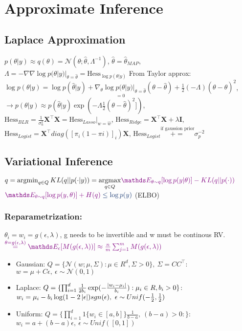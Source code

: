 \section{Approximate Inference}

\subsection{Laplace Approximation}
$p(\theta|y) \approx q(\theta) = \mathcal{N}(\theta; \hat{\theta}, \Lambda^{-1})$, 
$\hat{\theta}=\hat{\theta}_{MAP}$, 
$\Lambda = -\nabla\nabla \log p(\theta|y)|_{\theta=\hat{\theta}} = \text{Hess}_{\log p(\theta|y)}$
From Taylor approx: $\log p(\theta|y) = \log p(\hat{\theta}|y) +
\underset{=0}{\nabla_{\theta} \log p(\theta|y)|_{\theta=\hat{\theta}}}(\theta - \hat{\theta}) +
\frac{1}{2} (-\Lambda) (\theta - \hat{\theta})^{2}$, 
$\rightarrow p(\theta|y) \approx p(\hat{\theta}|y) \exp(- \Lambda \frac{1}{2} (\theta - \hat{\theta})^{2}])$,
$\text{Hess}_{BLR} = \frac{1}{\sigma_{n}^{2}}\bm{X}^{\top}\bm{X} = \text{Hess}_{Lasso}|_{w=\hat{w}}$,
$\text{Hess}_{Ridge} = \bm{X}^{\top}\bm{X} + \lambda\bm{I}$,
$\text{Hess}_{Logist} = \bm{X}^{\top}diag([\pi_{i}(1-\pi{i})]_{i})\bm{X}$,
$\text{Hess}_{Logist} \overset{\text{if gaussion prior}}{+=} \sigma_{p}^{-2}$

\subsection{Variational Inference}
$q=\argmin_{q \in Q}KL(q||p(\cdot|y))=\underset{q\in Q}\argmax \color{violet}\E[\theta \sim q]{\log p(y|\theta)} - KL(q||p(\cdot)) \\$
$\color{violet} \E[\theta \sim q]{\log p(y,\theta)} + H(q) \color{myblue} \leq \log p(y)$ \color{violet}(ELBO)
\color{black}
\subsubsection{Reparametrization:}
$\theta_{i}=w_{i}= g(\epsilon, \lambda)$, g needs to be invertible and w must be continous RV.\\
$\color{violet} \overset{\theta= g(\epsilon, \lambda)}{=} \E[\epsilon]{M(g(\epsilon, \lambda))} \approx \frac{n}{m} \sum_{j=1}^{m}M(g(\epsilon, \lambda))$

\begin{itemize}
    \item
    Gaussian: $Q=\{\mathcal{N}(w; \mu, \Sigma): \mu \in R^{d}, \Sigma > 0\},\ \Sigma=CC^{\top}$:
    $w=\mu +C \epsilon,\ \epsilon \sim \mathcal{N}(0,1)$
    \item
    Laplace: $Q=\{ \prod_{i=1}^{d} \frac{1}{2b_{i}} \exp(- \frac{\left\lvert w_{i}- \mu_{i}\right\rvert}{b_{i}}): \mu_{i} \in R, b_{i}>0\}$:
    $w_{i}= \mu_{i}-b_{i}\log(1-2\left\lvert\epsilon\right\rvert)sgn(\epsilon),\ \epsilon \sim Unif(-\frac{1}{2}, \frac{1}{2})$
    \item
    Uniform: $Q=\{\prod_{i=1}^{d} 1\{w_{i} \in \left[ a,b \right] \}\frac{1}{b-a},\ (b-a)>0:\}$:
    $w_{i}= a+(b-a)\epsilon,\ \epsilon \sim Unif(\left[ 0,1 \right] )$
\end{itemize}

